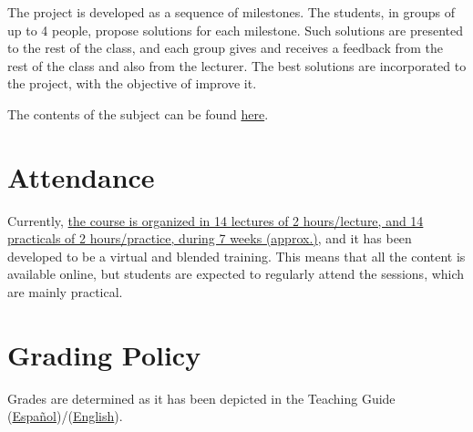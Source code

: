 The project is developed as a sequence of milestones. The students, in
groups of up to 4 people, propose solutions for each milestone. Such
solutions are presented to the rest of the class, and each group gives
and receives a feedback from the rest of the class and also from the
lecturer. The best solutions are incorporated to the project, with the
objective of improve it.

The contents of the subject can be found \href{https://tecnologias-multimedia.github.io/contents/}{here}.

\section{Attendance}
Currently,
\href{https://www.ual.es/estudios/grados/presentacion/plandeestudios/asignatura/4015/40154321}{the
  course is organized in 14 lectures of 2 hours/lecture, and 14
  practicals of 2 hours/practice, during 7 weeks (approx.)}, and it
has been developed to be a virtual and blended training. This means
that all the content is available online, but students are expected to
regularly attend the sessions, which are mainly practical.

\section{Grading Policy}
Grades are determined as it has been depicted in the Teaching Guide
(\href{https://portafirma.ual.es/pfirma/downloadReport/file?idDocument=4Jp82utmug&idRequest=QY36GYcOZQ}{Español})/(\href{https://portafirma.ual.es/pfirma/downloadReport/file?idDocument=Zcmom6qigD&idRequest=xXgueuk9oD}{English}).
